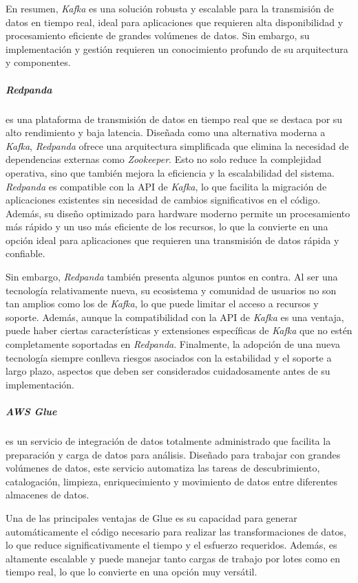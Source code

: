 En resumen, \textit{Kafka} es una solución robusta y escalable para la
transmisión de datos en tiempo real, ideal para aplicaciones que requieren alta
disponibilidad y procesamiento eficiente de grandes volúmenes de datos. Sin
embargo, su implementación y gestión requieren un conocimiento profundo de su
arquitectura y componentes.

\newpage{}
\subparagraph{Redpanda} es una plataforma de transmisión de datos en tiempo real
que se destaca por su alto rendimiento y baja latencia. Diseñada como una
alternativa moderna a \textit{Kafka}, \textit{Redpanda} ofrece una arquitectura
simplificada que elimina la necesidad de dependencias externas como
\textit{Zookeeper}. Esto no solo reduce la complejidad operativa, sino que
también mejora la eficiencia y la escalabilidad del sistema. \textit{Redpanda}
es compatible con la API de \textit{Kafka}, lo que facilita la migración de
aplicaciones existentes sin necesidad de cambios significativos en el código.
Además, su diseño optimizado para hardware moderno permite un procesamiento más
rápido y un uso más eficiente de los recursos, lo que la convierte en una opción
ideal para aplicaciones que requieren una transmisión de datos rápida y
confiable.

Sin embargo, \textit{Redpanda} también presenta algunos puntos en contra. Al ser
una tecnología relativamente nueva, su ecosistema y comunidad de usuarios no son
tan amplios como los de \textit{Kafka}, lo que puede limitar el acceso a
recursos y soporte. Además, aunque la compatibilidad con la API de
\textit{Kafka} es una ventaja, puede haber ciertas características y extensiones
específicas de \textit{Kafka} que no estén completamente soportadas en
\textit{Redpanda}. Finalmente, la adopción de una nueva tecnología siempre
conlleva riesgos asociados con la estabilidad y el soporte a largo plazo,
aspectos que deben ser considerados cuidadosamente antes de su implementación.

\subparagraph{AWS Glue} es un servicio de integración de datos totalmente
administrado que facilita la preparación y carga de datos para análisis.
Diseñado para trabajar con grandes volúmenes de datos, este servicio
automatiza las tareas de descubrimiento, catalogación, limpieza, enriquecimiento
y movimiento de datos entre diferentes almacenes de datos.

Una de las principales ventajas de Glue es su capacidad para generar
automáticamente el código necesario para realizar las transformaciones de datos,
lo que reduce significativamente el tiempo y el esfuerzo requeridos. Además, es
altamente escalable y puede manejar tanto cargas de trabajo por lotes como en
tiempo real, lo que lo convierte en una opción muy versátil.

